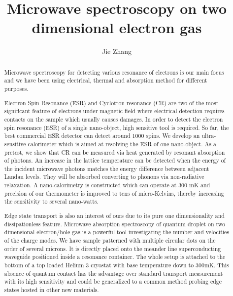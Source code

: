 \documentclass[12pt]{ruthesis}
\title{Microwave spectroscopy on two dimensional electron gas}
\author{Jie Zhang}
\begin{document}
  \begin{frontmatter}
   \maketitle

\begin{abstract}

Microwave spectroscopy for detecting various resonance  of electrons is our main focus and we have been using electrical, thermal and absorption method for different purposes.

Electron Spin Resonance (ESR) and Cyclotron resonance (CR) are two of the most significant feature of electrons under magnetic field where electrical detection requires contacts on the sample which usually causes damages. In order to detect the electron spin resonance (ESR) of a single nano-object, high sensitive tool is required. So far, the best commercial ESR detector can detect around 1000 spins. We develop an ultra-sensitive calorimeter which is aimed at resolving the ESR of one nano-object. As a pretest, we show that CR can be measured via heat generated by resonant absorption of photons. An increase in the lattice temperature can be detected when the energy of the incident microwave photons matches the energy difference between adjacent Landau levels. They will be absorbed converting to phonons via non-radiative relaxation. A nano-calorimetry is constructed which can operate at 300 mK and precision of our thermometer is improved to tens of micro-Kelvins, thereby increasing the sensitivity to several nano-watts.

Edge state transport is also an interest of ours due to its pure one dimensionality and dissipationless feature. Microwave absorption spectroscopy of quantum droplet on two dimensional electron/hole gas is a powerful tool investigating the number and velocities of the charge modes. We have sample patterned with multiple circular dots on the order of several microns. It is directly placed onto the meander line superconducting waveguide positioned inside a resonance container. The whole setup is attached to the bottom of a top loaded Helium 3 cryostat with base temperature down to 300mK. This absence of quantum contact has the advantage over standard transport measurement with its high sensitivity and could be generalized to a common method probing edge states hosted in other new materials.


\end{abstract}

%
\tableofcontents
\listoffigures
%   
\end{frontmatter}
\end{document}
